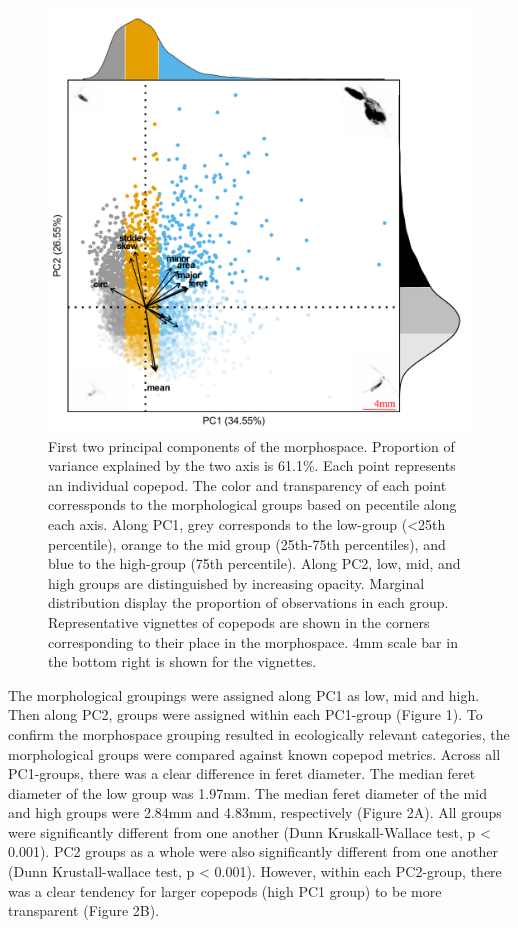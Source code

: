\documentclass[
]{article}
\begin{document}
\begin{figure}

{\centering \includegraphics{../media/figure_01.pdf}

}

\caption{First two principal components of the morphospace. Proportion
of variance explained by the two axis is 61.1\%. Each point represents
an individual copepod. The color and transparency of each point
corressponds to the morphological groups based on pecentile along each
axis. Along PC1, grey corresponds to the low-group (\textless25th
percentile), orange to the mid group (25th-75th percentiles), and blue
to the high-group (75th percentile). Along PC2, low, mid, and high
groups are distinguished by increasing opacity. Marginal distribution
display the proportion of observations in each group. Representative
vignettes of copepods are shown in the corners corresponding to their
place in the morphospace. 4mm scale bar in the bottom right is shown for
the vignettes.}

\end{figure}

The morphological groupings were assigned along PC1 as low, mid and
high. Then along PC2, groups were assigned within each PC1-group (Figure
1). To confirm the morphospace grouping resulted in ecologically
relevant categories, the morphological groups were compared against
known copepod metrics. Across all PC1-groups, there was a clear
difference in feret diameter. The median feret diameter of the low group
was 1.97mm. The median feret diameter of the mid and high groups were
2.84mm and 4.83mm, respectively (Figure 2A). All groups were
significantly different from one another (Dunn Kruskall-Wallace test, p
\textless{} 0.001). PC2 groups as a whole were also significantly
different from one another (Dunn Krustall-wallace test, p \textless{}
0.001). However, within each PC2-group, there was a clear tendency for
larger copepods (high PC1 group) to be more transparent (Figure 2B).
\end{document}
